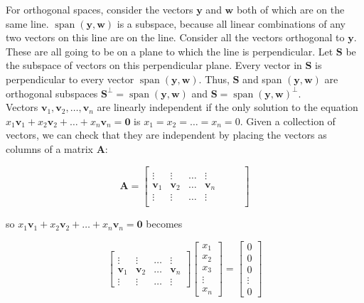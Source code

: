 \documentclass[main.tex]{subfiles}
\begin{document}
    For orthogonal spaces, consider the vectors $\mathbf{y}$ and $\mathbf{w}$ both of which are on the same line. $\operatorname{span}(\mathbf{y}, \mathbf{w})$ is a subspace, because all linear combinations of any two vectors on this line are on the line. Consider all the vectors orthogonal to $\mathbf{y}$. These are all going to be on a plane to which the line is perpendicular. Let $\mathbf{S}$ be the subspace of vectors on this perpendicular plane. Every vector in $\mathbf{S}$ is perpendicular to every vector $\operatorname{span}(\mathbf{y}, \mathbf{w})$. Thus, $\mathbf{S}$ and span $(\mathbf{y}, \mathbf{w})$ are orthogonal subspaces $\mathbf{S}^{\perp}=\operatorname{span}(\mathbf{y}, \mathbf{w})$ and $\mathbf{S}=\operatorname{span}(\mathbf{y}, \mathbf{w})^{\perp}$.\\
    
    Vectors $\mathbf{v}_{1}, \mathbf{v}_{2}, \ldots, \mathbf{v}_{n}$ are linearly independent if the only solution to the equation $x_{1} \mathbf{v}_{1}+x_{2} \mathbf{v}_{2}+\ldots+x_{n} \mathbf{v}_{n}=\mathbf{0}$ is $x_{1}=x_{2}=\ldots=x_{n}=0$. Given a collection of vectors, we can check that they are independent by placing the vectors as columns of a matrix $\mathbf{A}$:
    
    $$
    \mathbf{A}=\left[\begin{array}{cccc} 
    & & & \\
    \vdots & \vdots & \ldots & \vdots \\
    \mathbf{v}_{1} & \mathbf{v}_{2} & \ldots & \mathbf{v}_{n} \\
    \vdots & \vdots & \ldots & \vdots
    & & & \\
    \end{array}\right]
    $$
    
    so $x_{1} \mathbf{v}_{1}+x_{2} \mathbf{v}_{2}+\ldots+x_{n} \mathbf{v}_{n}=\mathbf{0}$ becomes 

    $$
    \left[\begin{array}{cccc} 
    & & & \\
    \vdots & \vdots & \ldots & \vdots \\
    \mathbf{v}_{1} & \mathbf{v}_{2} & \ldots & \mathbf{v}_{n} \\
    \vdots & \vdots & \ldots & \vdots
    \end{array}\right]\left[\begin{array}{c}
    x_{1} \\
    x_{2} \\
    x_{3} \\
    \vdots \\
    x_{n}
    \end{array}\right]=\left[\begin{array}{c}
    0 \\
    0 \\
    0 \\
    \vdots \\
    0
    \end{array}\right]
    $$
    
\end{document}
